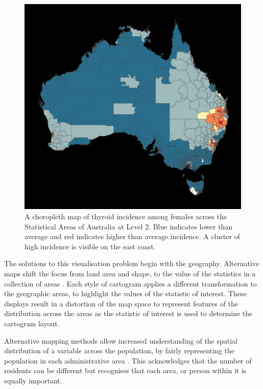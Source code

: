 \begin{Schunk}
\begin{figure}
\includegraphics[width=0.95\linewidth]{kobakian-cook_files/figure-latex/choro-1} \caption[A choropleth map of thyroid incidence among females across the Statistical Areas of Australia at Level 2]{A choropleth map of thyroid incidence among females across the Statistical Areas of Australia at Level 2. Blue indicates lower than average and red indicates higher than average incidence. A cluster of high incidence is visible on the east coast.}\label{fig:choro}
\end{figure}
\end{Schunk}

The solutions to this visualisation problem begin with the geography.
Alternative maps shift the focus from land area and shape, to the value
of the statistics in a collection of areas \citep{ACCAC}. Each style of
cartogram applies a different transformation to the geographic areas, to
highlight the values of the statistic of interest. These displays result
in a distortion of the map space to represent features of the
distribution across the areas \citep{ACCAC} as the statistic of interest
is used to determine the cartogram layout.

Alternative mapping methods allow increased understanding of the spatial
distribution of a variable across the population, by fairly representing
the population in each administrative area \citep{TAAM}. This
acknowledges that the number of residents can be different but
recognises that each area, or person within it is equally important.

